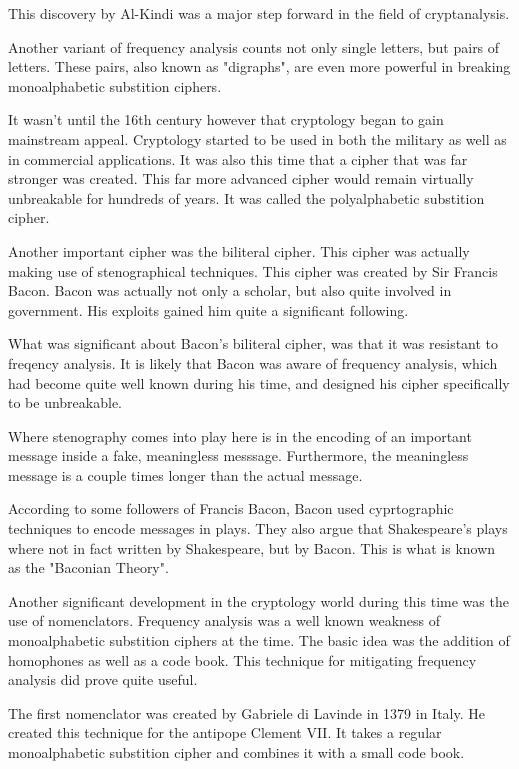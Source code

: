 \documentclass{article}
\begin{document}
    This discovery by Al-Kindi was a major step forward in the field of cryptanalysis.

    Another variant of frequency analysis counts not only single letters, but
    pairs of letters. These pairs, also known as "digraphs", are even more powerful
    in breaking monoalphabetic substition ciphers.

    It wasn't until the 16th century however that cryptology began to gain
    mainstream appeal.
    Cryptology started to be used in both the military as well as in commercial applications.
    It was also this time that a cipher that was far stronger was created.
    This far more advanced cipher would remain virtually unbreakable for hundreds of years.
    It was called the polyalphabetic substition cipher.

    Another important cipher was the biliteral cipher. This cipher was actually
    making use of stenographical techniques. This cipher was created
    by Sir Francis Bacon. Bacon was actually not only a scholar, but also quite
    involved in government. His exploits gained him quite a significant following.

    What was significant about Bacon's biliteral cipher, was that it was resistant to
    freqency analysis. It is likely that Bacon was aware of frequency analysis,
    which had become quite well known during his time, and designed his cipher
    specifically to be unbreakable.

    Where stenography comes into play here is in the encoding of an important message
    inside a fake, meaningless messsage. Furthermore, the meaningless message is
    a couple times longer than the actual message.

    According to some followers of Francis Bacon, Bacon used cyprtographic techniques
    to encode messages in plays. They also argue that Shakespeare's plays where
    not in fact written by Shakespeare, but by Bacon. This is what is known
    as the "Baconian Theory".

    Another significant development in the cryptology world during this time
    was the use of nomenclators. Frequency analysis was a well known weakness
    of monoalphabetic substition ciphers at the time.
    The basic idea was the addition of homophones as well as a code book.
    This technique for mitigating frequency analysis did prove quite useful.

    The first nomenclator was created by Gabriele di Lavinde in 1379 in Italy.
    He created this technique for the antipope Clement VII.
    It takes a regular monoalphabetic substition cipher and combines it with a
    small code book.
\end{document}
